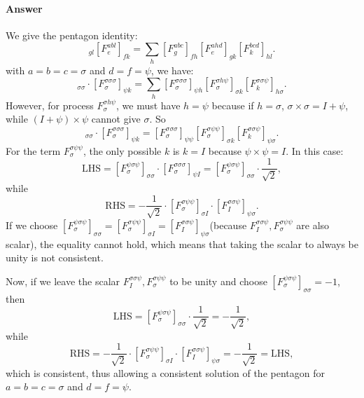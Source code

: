\documentclass{book}
\begin{document}
\paragraph{Answer}
We give the pentagon identity:
\begin{equation*}
[F_{e}^{fcd} ]_{gl} [F_{e}^{abl} ]_{fk} =\sum _{h} [F_{g}^{abc} ]_{fh} [F_{e}^{ahd} ]_{gk} [F_{k}^{bcd} ]_{hl} .
\end{equation*}
with $a=b=c=\sigma $ and $d=f=\psi $, we have:
\begin{equation*}
[F_{\sigma }^{\psi \sigma \psi } ]_{\sigma \sigma } \cdot [F_{\sigma }^{\sigma \sigma \sigma } ]_{\psi k} =\sum _{h} [F_{\sigma }^{\sigma \sigma \sigma } ]_{\psi h} [F_{\sigma }^{\sigma h\psi } ]_{\sigma k} [F_{k}^{\sigma \sigma \psi } ]_{h\sigma } .
\end{equation*}
However, for process $F_{\sigma }^{\sigma h\psi }$, we must have $h=\psi $ because if $h=\sigma $, $\sigma \times \sigma =I+\psi $, while $( I+\psi ) \times \psi $ cannot give $\sigma $. So
\begin{equation*}
[F_{\sigma }^{\psi \sigma \psi } ]_{\sigma \sigma } \cdot [F_{\sigma }^{\sigma \sigma \sigma } ]_{\psi k} =[F_{\sigma }^{\sigma \sigma \sigma } ]_{\psi \psi } [F_{\sigma }^{\sigma \psi \psi } ]_{\sigma k} [F_{k}^{\sigma \sigma \psi } ]_{\psi \sigma } .
\end{equation*}
For the term $F_{\sigma }^{\sigma \psi \psi }$, the only possible $k$ is $k=I$ because $\psi \times \psi =I$. In this case:
\begin{equation*}
\mathrm{LHS} =[F_{\sigma }^{\psi \sigma \psi } ]_{\sigma \sigma } \cdot [F_{\sigma }^{\sigma \sigma \sigma } ]_{\psi I} =[F_{\sigma }^{\psi \sigma \psi } ]_{\sigma \sigma } \cdot \frac{1}{\sqrt{2}} ,
\end{equation*}
while
\begin{equation*}
\mathrm{RHS} =-\frac{1}{\sqrt{2}} \cdot [F_{\sigma }^{\sigma \psi \psi } ]_{\sigma I} \cdot [F_{I}^{\sigma \sigma \psi } ]_{\psi \sigma } .
\end{equation*}
If we choose $[F_{\sigma }^{\psi \sigma \psi } ]_{\sigma \sigma } =[F_{\sigma }^{\sigma \psi \psi } ]_{\sigma I} =[F_{I}^{\sigma \sigma \psi } ]_{\psi \sigma }$(because $F_{I}^{\sigma \sigma \psi } ,F_{\sigma }^{\sigma \psi \psi }$ are also scalar), the equality cannot hold, which means that taking the scalar to always be unity is not consistent. 



Now, if we leave the scalar $F_{I}^{\sigma \sigma \psi } ,F_{\sigma }^{\sigma \psi \psi }$ to be unity and choose $[F_{\sigma }^{\psi \sigma \psi } ]_{\sigma \sigma } =-1$, then
\begin{equation*}
\mathrm{LHS} =[F_{\sigma }^{\psi \sigma \psi } ]_{\sigma \sigma } \cdot \frac{1}{\sqrt{2}} =-\frac{1}{\sqrt{2}} ,
\end{equation*}
while
\begin{equation*}
\mathrm{RHS} =-\frac{1}{\sqrt{2}} \cdot [F_{\sigma }^{\sigma \psi \psi } ]_{\sigma I} \cdot [F_{I}^{\sigma \sigma \psi } ]_{\psi \sigma } =-\frac{1}{\sqrt{2}} =\mathrm{LHS} ,
\end{equation*}
which is consistent, thus allowing a consistent solution of the pentagon for $a=b=c=\sigma $ and $d=f=\psi $.
\end{document}
